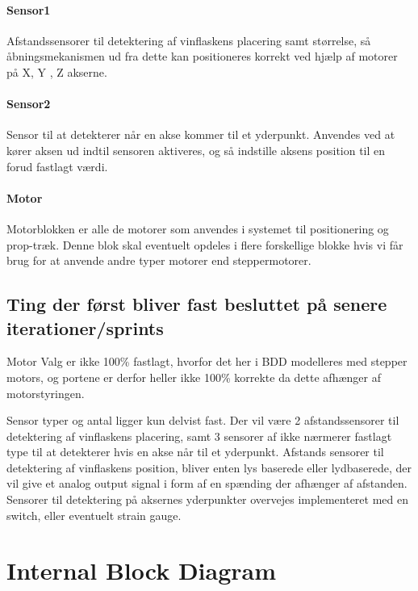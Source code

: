 \paragraph{Sensor1} Afstandssensorer til detektering af vinflaskens placering samt størrelse, så åbningsmekanismen ud fra dette kan positioneres korrekt ved hjælp af motorer på X, Y , Z akserne.

\paragraph{Sensor2} Sensor til at detekterer når en akse kommer til et yderpunkt. Anvendes ved at kører aksen ud indtil sensoren aktiveres, og så indstille aksens position til en forud fastlagt værdi.

\paragraph{Motor} Motorblokken er alle de motorer som anvendes i systemet til positionering og prop-træk. Denne blok skal eventuelt opdeles i flere forskellige blokke hvis vi får brug for at anvende andre typer motorer end steppermotorer.

\subsection{Ting der først bliver fast besluttet på senere iterationer/sprints}

Motor Valg er ikke 100\% fastlagt, hvorfor det her i BDD modelleres med stepper motors, og portene er derfor heller ikke 100\% korrekte da dette afhænger af motorstyringen.

Sensor typer og antal ligger kun delvist fast. Der vil være 2 afstandssensorer til detektering af vinflaskens placering, samt 3 sensorer af ikke nærmerer fastlagt type til at detekterer hvis en akse når til et yderpunkt. Afstands sensorer til detektering af vinflaskens position, bliver enten lys baserede eller lydbaserede, der vil give et analog output signal i form af en spænding der afhænger af afstanden. Sensorer til detektering på aksernes yderpunkter overvejes implementeret med en switch, eller eventuelt strain gauge.

\section{Internal Block Diagram}

